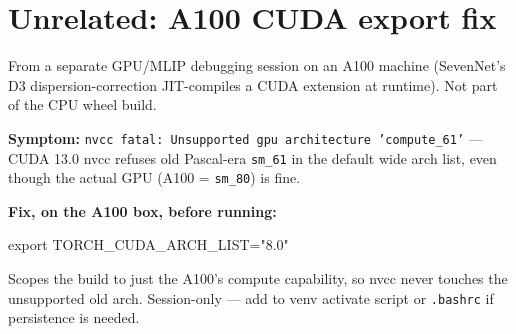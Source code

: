 \documentclass[11pt]{article}
\begin{document}
\appendix
\section{Unrelated: A100 CUDA export fix}

From a separate GPU/MLIP debugging session on an A100 machine (SevenNet's D3
dispersion-correction JIT-compiles a CUDA extension at runtime).  Not part of
the CPU wheel build.

\textbf{Symptom:} \texttt{nvcc fatal: Unsupported gpu architecture 'compute\_61'}
--- CUDA 13.0 nvcc refuses old Pascal-era \texttt{sm\_61} in the default wide
arch list, even though the actual GPU (A100 = \texttt{sm\_80}) is fine.

\textbf{Fix, on the A100 box, before running:}

\begin{codebox}
export TORCH_CUDA_ARCH_LIST="8.0"
\end{codebox}

Scopes the build to just the A100's compute capability, so nvcc never touches
the unsupported old arch.  Session-only --- add to venv activate script or
\texttt{.bashrc} if persistence is needed.
\end{document}
